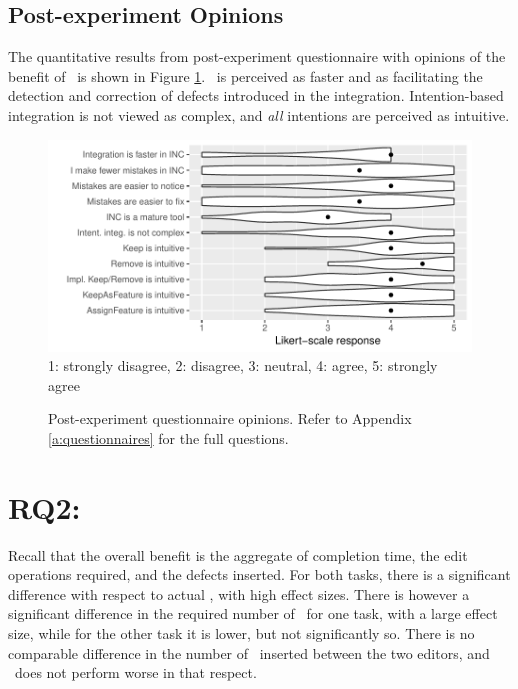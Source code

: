 \subsection{Post-experiment Opinions}
The quantitative results from post-experiment questionnaire with opinions of the benefit of \tooln~is shown in Figure \ref{fig:maturity}. \tooln~is perceived as faster and as facilitating the detection and correction of defects introduced in the integration. Intention-based integration is not viewed as complex, and \textit{all} intentions are perceived as intuitive.

\begin{figure}[ht]
    \centering
    \includegraphics{figure/incl-exit-quantitative.pdf}
    1: strongly disagree, 2: disagree, 3: neutral, 4: agree, 5: strongly agree
    \caption{Post-experiment questionnaire opinions. Refer to Appendix \ref{a:questionnaires} for the full questions.}
    \label{fig:maturity}
\end{figure}

\section{RQ2: \RQB}
Recall that the overall benefit is the aggregate of completion time, the edit operations required, and the defects inserted. For both tasks, there is a significant difference with respect to actual \ctime, with high effect sizes. There is however a significant difference in the required number of \eops~for one task, with a large effect size, while for the other task it is lower, but not significantly so. There is no comparable difference in the number of ~inserted between the two editors, and \tooln~does not perform worse in that respect.


